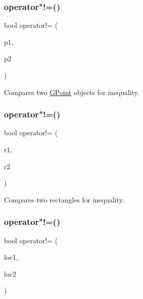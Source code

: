 \subsubsection{\texorpdfstring{operator"!=()}{operator!=()}\hspace{0.1cm}{\footnotesize\ttfamily [2/4]}}
{\footnotesize\ttfamily bool operator!= (\begin{DoxyParamCaption}\item[{const \mbox{\hyperlink{structsgl_1_1GPoint}{G\+Point}} \&}]{p1,  }\item[{const \mbox{\hyperlink{structsgl_1_1GPoint}{G\+Point}} \&}]{p2 }\end{DoxyParamCaption})}



Compares two \mbox{\hyperlink{structsgl_1_1GPoint}{G\+Point}} objects for inequality. 

\mbox{\label{namespacesgl_ab1f9c96d97d7895bcd908ba94af3bed7}} 
\subsubsection{\texorpdfstring{operator"!=()}{operator!=()}\hspace{0.1cm}{\footnotesize\ttfamily [3/4]}}
{\footnotesize\ttfamily bool operator!= (\begin{DoxyParamCaption}\item[{const \mbox{\hyperlink{structsgl_1_1GRectangle}{G\+Rectangle}} \&}]{r1,  }\item[{const \mbox{\hyperlink{structsgl_1_1GRectangle}{G\+Rectangle}} \&}]{r2 }\end{DoxyParamCaption})}



Compares two rectangles for inequality. 

\mbox{\label{namespacesgl_a7062216801f5b713e2df845d02d397e0}} 
\subsubsection{\texorpdfstring{operator"!=()}{operator!=()}\hspace{0.1cm}{\footnotesize\ttfamily [4/4]}}
{\footnotesize\ttfamily bool operator!= (\begin{DoxyParamCaption}\item[{const \mbox{\hyperlink{structsgl_1_1GTableIndex}{G\+Table\+Index}} \&}]{loc1,  }\item[{const \mbox{\hyperlink{structsgl_1_1GTableIndex}{G\+Table\+Index}} \&}]{loc2 }\end{DoxyParamCaption})}

